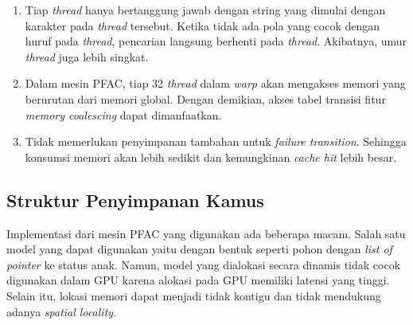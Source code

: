       \begin{enumerate}

        \item 
        Tiap \emph{thread} hanya bertanggung jawab dengan string yang dimulai dengan karakter pada \emph{thread} tersebut. Ketika tidak ada pola yang cocok dengan huruf pada \emph{thread}, pencarian langsung berhenti pada \emph{thread}. Akibatnya, umur \emph{thread} juga lebih singkat.
        
        \item 
        Dalam mesin PFAC, tiap 32 \emph{thread} dalam \emph{warp} akan mengakses memori yang berurutan dari memori global. Dengan demikian, akses tabel transisi fitur \emph{memory coalescing} dapat dimanfaatkan.
        
        \item
        Tidak memerlukan penyimpanan tambahan untuk \emph{failure transition}. Sehingga konsumsi memori akan lebih sedikit dan kemungkinan \emph{cache hit} lebih besar.
        
      \end{enumerate}
      
      
      
      \subsection{Struktur Penyimpanan Kamus}
      
      Implementasi dari mesin PFAC yang digunakan ada beberapa macam. Salah satu model yang dapat digunakan yaitu dengan bentuk seperti pohon dengan \emph{list of pointer} ke status anak. Namun, model yang dialokasi secara dinamis tidak cocok digunakan dalam GPU karena alokasi pada GPU memiliki latensi yang tinggi. Selain itu, lokasi memori dapat menjadi tidak kontigu dan tidak mendukung adanya \emph{spatial locality}.
      
